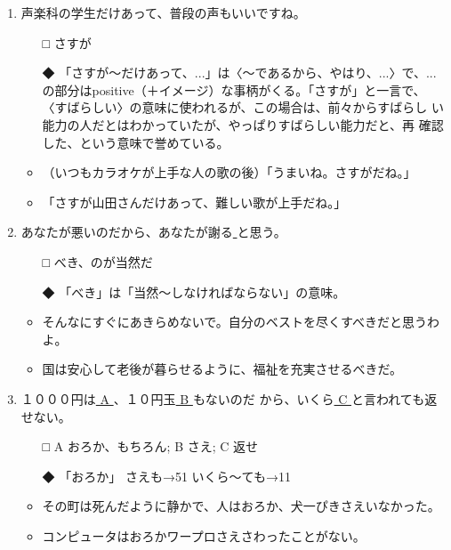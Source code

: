 \documentclass[
uplatex,
b5paper,
10pt,
dvipdfmx
]{jsbook}
\begin{document}
\begin{enumerate}
\item \underline{   }声楽科の学生だけあって、普段の声もいいですね。

\begin{itemize}
\item[□]  さすが
\item[◆] 「さすが〜だけあって、...」は〈〜であるから、やはり、...〉で、...
	  の部分はpositive（＋イメージ）な事柄がくる。「さすが」と一言で、
	  〈すばらしい〉の意味に使われるが、この場合は、前々からすばらし
	  い能力の人だとはわかっていたが、やっぱりすばらしい能力だと、再
	  確認した、という意味で誉めている。
\end{itemize}
\begin{itemize}
\item （いつもカラオケが上手な人の歌の後）「うまいね。さすがだね。」
\item 「さすが山田さんだけあって、難しい歌が上手だね。」
\end{itemize}

\item あなたが悪いのだから、あなたが謝る\underline{    }と思う。

\begin{itemize}
\item[□]  べき、のが当然だ
\item[◆] 「べき」は「当然〜しなければならない」の意味。
\end{itemize}
\begin{itemize}
\item そんなにすぐにあきらめないで。自分のベストを尽くすべきだと思うわよ。
\item 国は安心して老後が暮らせるように、福祉を充実させるべきだ。
\end{itemize}

\item １０００円は\underline{ A }、１０円玉\underline{ B }もないのだ
      から、いくら\underline{ C }と言われても返せない。

\begin{itemize}
\item[□]  A おろか、もちろん; B さえ; C 返せ
\item[◆] 「おろか」 さえも→51 いくら〜ても→11
\end{itemize}
\begin{itemize}
\item その町は死んだように静かで、人はおろか、犬一ぴきさえいなかった。
\item コンピュータはおろかワープロさえさわったことがない。
\end{itemize}
\end{enumerate}
\end{document}
